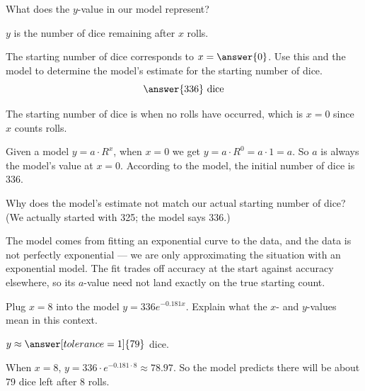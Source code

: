 \documentclass[12pt]{ximera}
\begin{document}
\begin{problem}
What does the $y$-value in our model represent?
\begin{freeResponse}
\end{freeResponse}
\begin{solution}
$y$ is the number of dice remaining after $x$ rolls.
\end{solution}
\end{problem}

\begin{problem}
The starting number of dice corresponds to $x = \answer{0}$. Use this and the model
to determine the model's estimate for the starting number of dice.
\[
\answer{336} \text{ dice}
\]

\begin{solution}
The starting number of dice is when no rolls have occurred, which is $x = 0$ since
$x$ counts rolls.

Given a model $y = a \cdot R^{x}$, when $x = 0$ we get
$y = a \cdot R^{0} = a \cdot 1 = a$. So $a$ is always the model's value at $x = 0$.
According to the model, the initial number of dice is $336$.
\end{solution}
\end{problem}

\begin{problem}
Why does the model's estimate not match our actual starting number of dice? (We
actually started with 325; the model says 336.)

\begin{freeResponse}
\end{freeResponse}

\begin{solution}
The model comes from fitting an exponential curve to the data, and the data is not
perfectly exponential --- we are only approximating the situation with an exponential
model. The fit trades off accuracy at the start against accuracy elsewhere, so its
$a$-value need not land exactly on the true starting count.
\end{solution}
\end{problem}

\begin{problem}
Plug $x = 8$ into the model $y = 336 e^{-0.181x}$. Explain what the $x$- and
$y$-values mean in this context.

$y \approx \answer[tolerance=1]{79}$ dice.

\begin{freeResponse}
\end{freeResponse}

\begin{solution}
When $x = 8$, $y = 336 \cdot e^{-0.181 \cdot 8} \approx 78.97$. So the model predicts
there will be about 79 dice left after 8 rolls.
\end{solution}
\end{problem}
\end{document}

